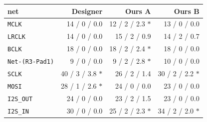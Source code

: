 \begin{tabular}{lrrr}
\toprule
net & Designer & Ours A & Ours B \\
\midrule
\texttt{MCLK} & 14 / 0 / 0.0 & 12 / 2 / 2.3 $\ast$ & 13 / 0 / 0.0 \\
\texttt{LRCLK} & 14 / 0 / 0.0 & 15 / 2 / 0.9 & 14 / 2 / 0.7 \\
\texttt{BCLK} & 18 / 0 / 0.0 & 18 / 2 / 2.4 $\ast$ & 18 / 0 / 0.0 \\
\texttt{Net-(R3-Pad1)} & 9 / 0 / 0.0 & 9 / 2 / 2.8 $\ast$ & 10 / 0 / 0.0 \\
\texttt{SCLK} & 40 / 3 / 3.8 $\ast$ & 26 / 2 / 1.4 & 30 / 2 / 2.2 $\ast$ \\
\texttt{MOSI} & 28 / 1 / 2.6 $\ast$ & 24 / 0 / 0.0 & 23 / 0 / 0.0 \\
\texttt{I2S\_OUT} & 24 / 0 / 0.0 & 23 / 2 / 1.5 & 23 / 0 / 0.0 \\
\texttt{I2S\_IN} & 30 / 0 / 0.0 & 25 / 2 / 2.3 $\ast$ & 34 / 2 / 2.0 $\ast$ \\
\bottomrule
\end{tabular}
